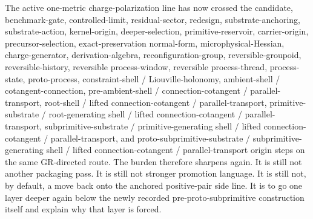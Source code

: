 \documentclass[11pt]{article}
\begin{document}
The active one-metric charge-polarization line has now crossed the candidate, benchmark-gate, controlled-limit, residual-sector, redesign, substrate-anchoring, substrate-action, kernel-origin, deeper-selection, primitive-reservoir, carrier-origin, precursor-selection, exact-preservation normal-form, microphysical-Hessian, charge-generator, derivation-algebra, reconfiguration-group, reversible-groupoid, reversible-history, reversible process-window, reversible process-thread, process-state, proto-process, constraint-shell / Liouville-holonomy, ambient-shell / cotangent-connection, pre-ambient-shell / connection-cotangent / parallel-transport, root-shell / lifted connection-cotangent / parallel-transport, primitive-substrate / root-generating shell / lifted connection-cotangent / parallel-transport, subprimitive-substrate / primitive-generating shell / lifted connection-cotangent / parallel-transport, and proto-subprimitive-substrate / subprimitive-generating shell / lifted connection-cotangent / parallel-transport origin steps on the same GR-directed route. The burden therefore sharpens again. It is still not another packaging pass. It is still not stronger promotion language. It is still not, by default, a move back onto the anchored positive-pair side line. It is to go one layer deeper again below the newly recorded pre-proto-subprimitive construction itself and explain why that layer is forced.
\end{document}
